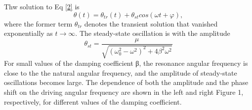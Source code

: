     Thw solution to Eq \ref{2} is
    \[
        \theta(t)=\theta_{tr}(t)+\theta_{st}cos(\omega t+\varphi),
    \]
    where the former term $\theta_{tr}$ denotes the transient solution that vanished exponentially as $t\rightarrow \infty$. The steady-state  oscillation is with the amplitude
    \[
        \theta_{st}=\frac{\mu}{\sqrt{(\omega_0^2-\omega^2)^2+4\beta^2\omega^2}}
    \]
    For small values of the damping coefficient β, the resonance angular frequency is close to the the natural angular frequency, and the amplitude of steady-state oscillations becomes large. The dependence of both the amplitude and the phase shift on the driving angular frequency are shown in the left and right Figure 1, respectively, for different values of the damping coefficient.